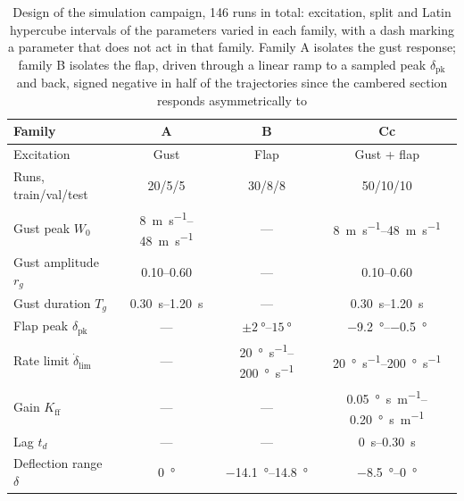 \begin{table}[t]
    \centering
    \begin{tabular}{|l|c|c|c|}
    \hline
    \rowcolor{bluePoli!40}
    Family & A & B & Cc \T\B \\
    \hline\hline
    Excitation           & Gust       & Flap           & Gust + flap \T\B \\
    \hline
    Runs, train/val/test & 20/5/5     & 30/8/8         & 50/10/10 \T\B \\
    \hline
    Gust peak $W_0$                                       & \SIrange{8}{48}{\meter\per\second}      & ---            & \SIrange{8}{48}{\meter\per\second} \T\B \\
    \hline
    Gust amplitude $r_g$                                  & 0.10--0.60 & ---            & 0.10--0.60 \T\B \\
    \hline
    Gust duration $T_g$                                   & \SIrange{0.30}{1.20}{\second} & ---            & \SIrange{0.30}{1.20}{\second} \T\B \\
    \hline
    Flap peak $\delta_{\mathrm{pk}}$                      & ---        & $\pm\SIrange{2}{15}{\degree}$  & \SIrange{-9.2}{-0.5}{\degree} \T\B \\
    \hline
    Rate limit $\dot\delta_{\mathrm{lim}}$                & ---        & \SIrange{20}{200}{\degree\per\second}        & \SIrange{20}{200}{\degree\per\second} \T\B \\
    \hline
    Gain $K_{\mathrm{ff}}$                                & ---        & ---            & \SIrange{0.05}{0.20}{\degree\second\per\meter} \T\B \\
    \hline
    Lag $t_d$                                             & ---        & ---            & \SIrange{0}{0.30}{\second} \T\B \\
    \hline
    Deflection range $\delta$                             & \SI{0}{\degree}        & \SIrange{-14.1}{14.8}{\degree} & \SIrange{-8.5}{0}{\degree} \T\B \\
    \hline
    \end{tabular}
    \\[6pt]
    \caption{Design of the simulation campaign, 146 runs in total: excitation, split and Latin
    hypercube intervals of the parameters varied in each family, with a dash marking a parameter
    that does not act in that family. Family A isolates the gust response; family B isolates the
    flap, driven through a linear ramp to a sampled peak $\delta_{\mathrm{pk}}$ and back, signed
    negative in half of the trajectories since the cambered section responds asymmetrically to
}
\end{table}
